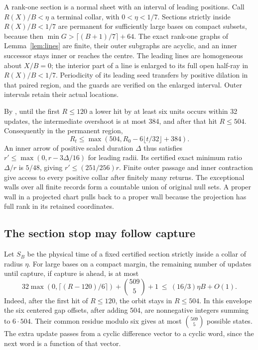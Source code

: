 \documentclass[11pt,reqno]{amsart}
\theoremstyle{definition}
\begin{document}
A rank-one section is a normal sheet with an interval of leading
positions. Call \(R(X)/B<\eta\) a terminal collar, with
\(0<\eta<1/7\). Sections strictly inside \(R(X)/B<1/7\) are permanent
for sufficiently large bases on compact subsets, because then
\(\min G>\lceil(B+1)/7\rceil+64\). The exact rank-one graphs of
Lemma~\ref{lem:lines} are finite, their outer subgraphs are acyclic,
and an inner successor stays inner or reaches the centre. The leading
lines are homogeneous about \(X/B=0\); the interior part of a line is
enlarged to its full open half-ray in \(R(X)/B<1/7\). Periodicity of
its leading seed transfers by positive dilation in that paired region,
and the guards are verified on the enlarged interval. Outer intervals
retain their actual locations.

By \cite[Section~6 and Appendix~E]{G6}, until the first \(R\le120\)
a lower hit by at least six units occurs within 32 updates, the
intermediate overshoot is at most 384, and after that hit \(R\le504\).
Consequently in the permanent region,
\[
 R_t\le\max(504,R_0-6\lfloor t/32\rfloor+384).
\]
An inner arrow of positive scaled duration \(\Delta\) thus satisfies
\(r'\le\max(0,r-3\Delta/16)\) for leading radii. Its certified exact
minimum ratio \(\Delta/r\) is \(5/48\), giving
\(r'\le(251/256)r\). Finite outer passage and inner contraction give
access to every positive collar after finitely many returns. The
exceptional walls over all finite records form a countable union of
original null sets. A proper wall in a projected chart pulls back
to a proper wall because the projection has full rank in its
retained coordinates.

\subsection{The section stop may follow capture}
Let \(S_B\) be the physical time of a fixed certified section strictly
inside a collar of radius \(\eta\). For large bases on a compact
margin, the remaining number of updates until capture, if capture
is ahead, is at most
\begin{equation}\label{eq:forward}
 32\max(0,\lceil(R-120)/6\rceil)+\binom{509}{5}+1
 \ \le\ (16/3)\eta B+O(1).
\end{equation}
Indeed, after the first hit of \(R\le120\), the orbit stays in
\(R\le504\). In this envelope the six centered gap offsets, after adding
504, are nonnegative integers summing to \(6\cdot504\). Their common
residue modulo six gives at most \(\binom{509}{5}\) possible states.
The extra update passes from a cyclic difference vector to a cyclic
word, since the next word is a function of that vector.
\end{document}
